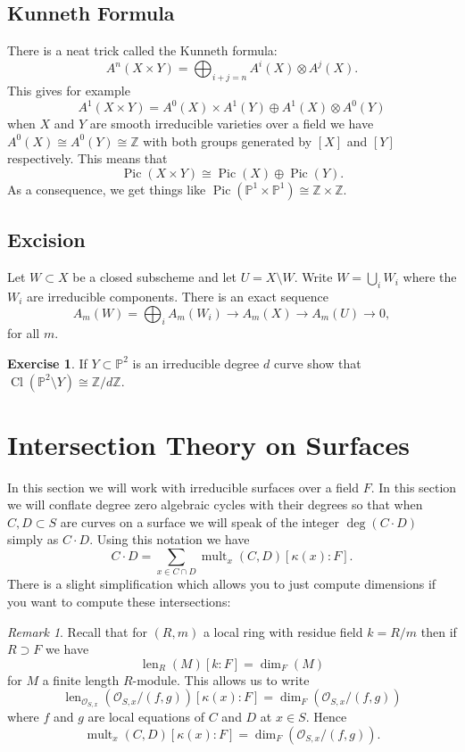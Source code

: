 \documentclass[12pt]{article}
\numberwithin{equation}{section}
\theoremstyle{definition}
\newtheorem{exercise}[theorem]{Exercise}
\theoremstyle{remark}
\newtheorem{remark}[theorem]{Remark}
\newcommand{\ZZ}{\mathbb{Z}}
\newcommand{\Ocal}{\mathcal{O}}
\newcommand{\PP}{\mathbb{P}}
\newcommand{\Pic}{\operatorname{Pic}}
\newcommand{\Cl}{\operatorname{Cl}}
\newcommand{\mult}{\operatorname{mult}}
\newcommand{\len}{\operatorname{len}}
\begin{document}
\subsection{Kunneth Formula}
There is a neat trick called the Kunneth formula:
\begin{equation}
A^n(X\times Y) = \bigoplus_{i+j=n}A^i(X) \otimes A^j(X).
\end{equation}
This gives for example 
 $$ A^1(X\times Y) = A^0(X)\times A^1(Y) \oplus A^1(X)\otimes A^0(Y)$$
when $X$ and $Y$ are smooth irreducible varieties over a field we have $A^0(X)\cong A^0(Y) \cong \ZZ$ with both groups generated by $[X]$ and $[Y]$ respectively. 
This means that 
 $$ \Pic(X\times Y) \cong \Pic(X)\oplus \Pic(Y).$$
As a consequence, we get things like $\Pic(\PP^1\times \PP^1) \cong \ZZ\times \ZZ$. 

\subsection{Excision}
Let $W \subset X$ be a closed subscheme and let $U = X\setminus W$. 
Write $W = \bigcup_i W_i$ where the $W_i$ are irreducible components.
There is an exact sequence
 $$ A_m(W)=\bigoplus_i A_m(W_i) \to A_m(X) \to A_m(U) \to 0,$$
for all $m$. 

\begin{exercise}
	If $Y \subset\PP^2$ is an irreducible degree $d$ curve show that $\Cl(\PP^2\setminus Y) \cong \ZZ/d\ZZ$. 
\end{exercise}

\section{Intersection Theory on Surfaces}
In this section we will work with irreducible surfaces over a field $F$. 
In this section we will conflate degree zero algebraic cycles with their degrees so that when $C,D \subset S$ are curves on a surface we will speak of the integer $\deg(C\cdot D)$ simply as $C\cdot D$.  
Using this notation we have 
 $$ C\cdot D = \sum_{x \in C\cap D} \mult_x(C,D)[\kappa(x):F].$$
There is a slight simplification which allows you to just compute dimensions if you want to compute these intersections:
\begin{remark}
Recall that for $(R,m)$ a local ring with residue field $k=R/m$ then if $R \supset F$ we have $$\len_R(M)[k:F] = \dim_F(M) $$ for $M$ a finite length $R$-module. 
This allows us to write 
 $$ \len_{\Ocal_{S,x}}(\Ocal_{S,x}/(f,g)) [\kappa(x):F] = \dim_F( \Ocal_{S,x}/(f,g))$$
where $f$ and $g$ are local equations of $C$ and $D$ at $x\in S$. Hence 
 $$ \mult_x(C,D)[\kappa(x):F] = \dim_F(\Ocal_{S,x}/(f,g)).$$
\end{remark}
\end{document}
